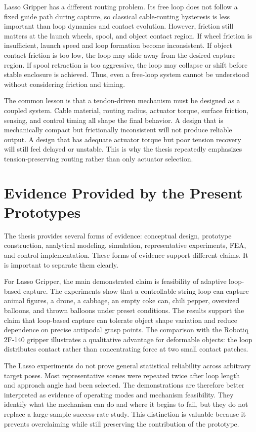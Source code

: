 Lasso Gripper has a different routing problem. Its free loop does not follow a fixed guide path during capture, so classical cable-routing hysteresis is less important than loop dynamics and contact evolution. However, friction still matters at the launch wheels, spool, and object contact region. If wheel friction is insufficient, launch speed and loop formation become inconsistent. If object contact friction is too low, the loop may slide away from the desired capture region. If spool retraction is too aggressive, the loop may collapse or shift before stable enclosure is achieved. Thus, even a free-loop system cannot be understood without considering friction and timing.

The common lesson is that a tendon-driven mechanism must be designed as a coupled system. Cable material, routing radius, actuator torque, surface friction, sensing, and control timing all shape the final behavior. A design that is mechanically compact but frictionally inconsistent will not produce reliable output. A design that has adequate actuator torque but poor tension recovery will still feel delayed or unstable. This is why the thesis repeatedly emphasizes tension-preserving routing rather than only actuator selection.

\section{Evidence Provided by the Present Prototypes}

The thesis provides several forms of evidence: conceptual design, prototype construction, analytical modeling, simulation, representative experiments, FEA, and control implementation. These forms of evidence support different claims. It is important to separate them clearly.

For Lasso Gripper, the main demonstrated claim is feasibility of adaptive loop-based capture. The experiments show that a controllable string loop can capture animal figures, a drone, a cabbage, an empty coke can, chili pepper, oversized balloons, and thrown balloons under preset conditions. The results support the claim that loop-based capture can tolerate object shape variation and reduce dependence on precise antipodal grasp points. The comparison with the Robotiq 2F-140 gripper illustrates a qualitative advantage for deformable objects: the loop distributes contact rather than concentrating force at two small contact patches.

The Lasso experiments do not prove general statistical reliability across arbitrary target poses. Most representative scenes were repeated twice after loop length and approach angle had been selected. The demonstrations are therefore better interpreted as evidence of operating modes and mechanism feasibility. They identify what the mechanism can do and where it begins to fail, but they do not replace a large-sample success-rate study. This distinction is valuable because it prevents overclaiming while still preserving the contribution of the prototype.

